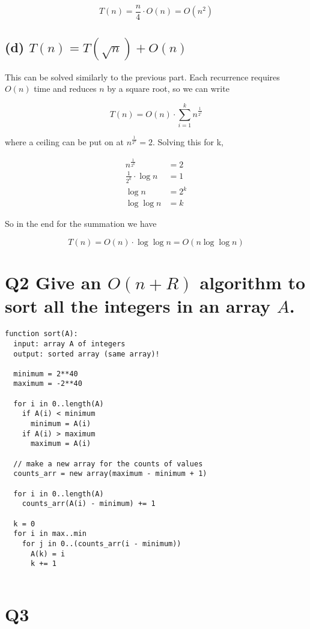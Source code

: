 \documentclass{article}
\begin{document}
$$T(n) = \frac{n}{4} \cdot O(n) = O(n^2)$$

\subsection*{(d) \normalsize $T(n) = T(\sqrt{n}) + O(n)$}

This can be solved similarly to the previous part. Each recurrence requires $O(n)$ time and reduces $n$ by a square root, so we can write

$$T(n) = O(n) \cdot \sum_{i = 1}^k n^{\frac{1}{2^i}}$$

where a ceiling can be put on at $n^{\frac{1}{2^k}} = 2$. Solving this for k,

\begin{align*}
  n^{\frac{1}{2^k}} &= 2 \\
  \frac{1}{2^k} \cdot \log n &= 1 \\
  \log n &= 2^k \\
  \log\log n &= k
\end{align*}

So in the end for the summation we have

$$T(n) = O(n) \cdot \log\log n = O(n \log \log n)$$




\section*{Q2 \normalsize Give an $O(n+R)$ algorithm to sort all the integers in an array $A$.}

\begin{verbatim}
function sort(A):
  input: array A of integers
  output: sorted array (same array)!

  minimum = 2**40
  maximum = -2**40

  for i in 0..length(A)
    if A(i) < minimum
      minimum = A(i)
    if A(i) > maximum
      maximum = A(i)

  // make a new array for the counts of values
  counts_arr = new array(maximum - minimum + 1)

  for i in 0..length(A)
    counts_arr(A(i) - minimum) += 1

  k = 0
  for i in max..min
    for j in 0..(counts_arr(i - minimum))
      A(k) = i
      k += 1
  
\end{verbatim}

\section*{Q3 \normalsize}
\end{document}
